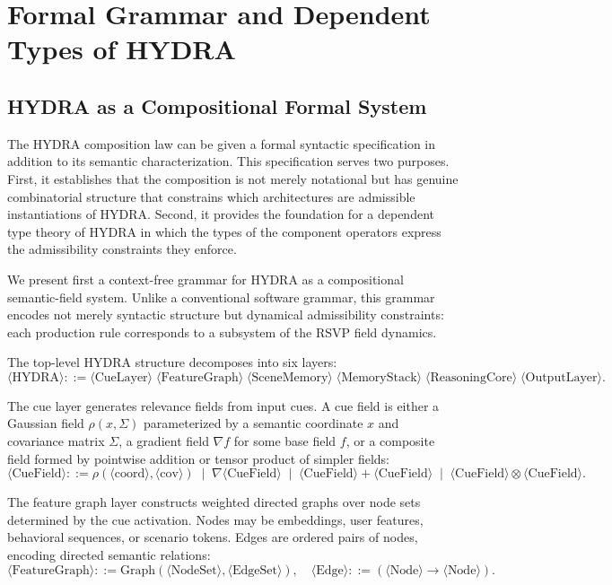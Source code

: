 \documentclass[12pt, a4paper, openany]{book}
\theoremstyle{plain}
\theoremstyle{definition}
\theoremstyle{remark}
\begin{document}
\chapter{Formal Grammar and Dependent Types of HYDRA}

\section{HYDRA as a Compositional Formal System}

The HYDRA composition law can be given a formal syntactic specification in addition to its semantic characterization. This specification serves two purposes. First, it establishes that the composition is not merely notational but has genuine combinatorial structure that constrains which architectures are admissible instantiations of HYDRA. Second, it provides the foundation for a dependent type theory of HYDRA in which the types of the component operators express the admissibility constraints they enforce.

We present first a context-free grammar for HYDRA as a compositional semantic-field system. Unlike a conventional software grammar, this grammar encodes not merely syntactic structure but dynamical admissibility constraints: each production rule corresponds to a subsystem of the RSVP field dynamics.

The top-level HYDRA structure decomposes into six layers:
\[
\langle\text{HYDRA}\rangle
::= \langle\text{CueLayer}\rangle\;
    \langle\text{FeatureGraph}\rangle\;
    \langle\text{SceneMemory}\rangle\;
    \langle\text{MemoryStack}\rangle\;
    \langle\text{ReasoningCore}\rangle\;
    \langle\text{OutputLayer}\rangle.
\]

The cue layer generates relevance fields from input cues. A cue field is either a Gaussian field $\rho(x, \Sigma)$ parameterized by a semantic coordinate $x$ and covariance matrix $\Sigma$, a gradient field $\nabla f$ for some base field $f$, or a composite field formed by pointwise addition or tensor product of simpler fields:
\[
\langle\text{CueField}\rangle ::= \rho(\langle\text{coord}\rangle, \langle\text{cov}\rangle)
\;\mid\; \nabla\langle\text{CueField}\rangle
\;\mid\; \langle\text{CueField}\rangle + \langle\text{CueField}\rangle
\;\mid\; \langle\text{CueField}\rangle \otimes \langle\text{CueField}\rangle.
\]

The feature graph layer constructs weighted directed graphs over node sets determined by the cue activation. Nodes may be embeddings, user features, behavioral sequences, or scenario tokens. Edges are ordered pairs of nodes, encoding directed semantic relations:
\[
\langle\text{FeatureGraph}\rangle ::= \mathrm{Graph}(\langle\text{NodeSet}\rangle, \langle\text{EdgeSet}\rangle),
\quad
\langle\text{Edge}\rangle ::= (\langle\text{Node}\rangle \to \langle\text{Node}\rangle).
\]
\end{document}

